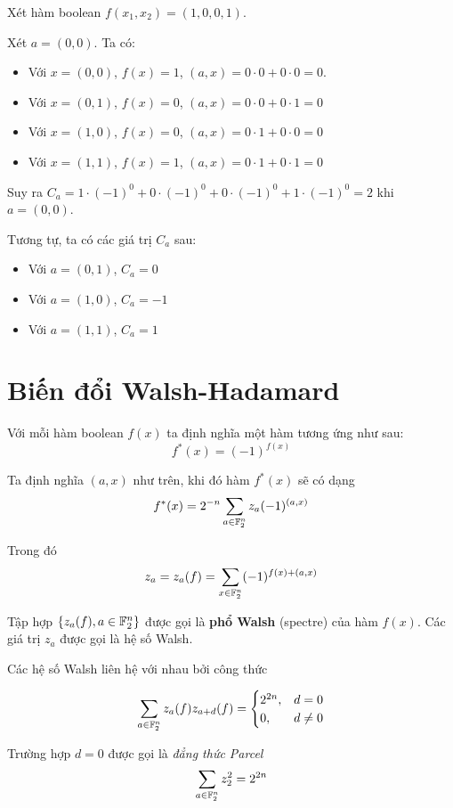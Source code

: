 \begin{example}
    Xét hàm boolean $f(x_1, x_2) = (1, 0, 0, 1)$.

    Xét $a = (0, 0)$. Ta có:
    \begin{itemize}
        \item Với $x = (0, 0)$, $f(x) = 1$, $(a, x) =
        0 \cdot 0 + 0 \cdot 0 = 0$.
        \item Với $x = (0, 1)$, $f(x) = 0$, $(a, x) = 
        0 \cdot 0 + 0 \cdot 1 = 0$
        \item Với $x = (1, 0)$, $f(x) = 0$, $(a, x) = 
        0 \cdot 1 + 0 \cdot 0 = 0$
        \item Với $x = (1, 1)$, $f(x) = 1$, $(a, x) = 
        0 \cdot 1 + 0 \cdot 1 = 0$
    \end{itemize}
    Suy ra $C_a = 1 \cdot (-1)^0 + 0 \cdot (-1)^0 + 0 \cdot (-1)^0
        + 1 \cdot (-1)^0 = 2$ khi $a = (0, 0)$.

    Tương tự, ta có các giá trị $C_a$ sau:
    \begin{itemize}
        \item Với $a = (0, 1)$, $C_a = 0$
        \item Với $a = (1, 0)$, $C_a = -1$
        \item Với $a = (1, 1)$, $C_a = 1$
    \end{itemize}
\end{example}

\section{Biến đổi Walsh-Hadamard}

Với mỗi hàm boolean $f(x)$ ta định nghĩa một hàm tương ứng như sau:
\[f^*(x) = (-1)^{f(x)}\]

Ta định nghĩa $(a, x)$ như trên, khi đó hàm $f^*(x)$ sẽ có dạng
\begin{equation}
    f^*(x) = 2^{-n} \sum_{a \in \mathbb{F}_2^n} z_a (-1)^{(a, x)}
\end{equation}

Trong đó
\begin{equation}
    z_a = z_a (f) = \sum_{x \in \mathbb{F}_2^n} (-1)^{f(x) + (a, x)}
\end{equation}

Tập hợp $\{z_a(f), a \in \mathbb{F}_2^n\}$ được gọi là \textbf{phổ
Walsh} (spectre) của hàm $f(x)$. Các giá trị $z_a$ được gọi là hệ số
Walsh.

Các hệ số Walsh liên hệ với nhau bởi công thức

\begin{equation}
    \sum_{a \in \mathbb{F}_2^n} z_a(f) z_{a+d}(f) = 
    \begin{cases}
    2^{2n}, & d = 0 \\
    0, & d \neq 0
    \end{cases}
\end{equation}

Trường hợp $d = 0$ được gọi là \textit{đẳng thức Parcel}
\begin{equation}
    \sum_{a \in \mathbb{F}_2^n} z_2^2 = 2^{2n}
\end{equation}